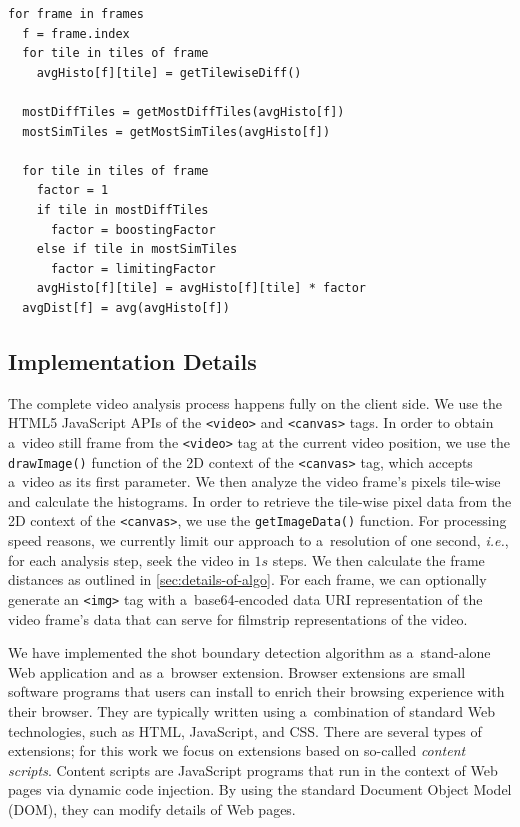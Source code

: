 \begin{lstlisting}[caption=Pseudocode of the shot boundary detection
  algorithm,
  label=code:algorithm, float]
for frame in frames
  f = frame.index  
  for tile in tiles of frame      
    avgHisto[f][tile] = getTilewiseDiff()
 
  mostDiffTiles = getMostDiffTiles(avgHisto[f])
  mostSimTiles = getMostSimTiles(avgHisto[f])
 
  for tile in tiles of frame    
    factor = 1  
    if tile in mostDiffTiles
      factor = boostingFactor
    else if tile in mostSimTiles
      factor = limitingFactor
    avgHisto[f][tile] = avgHisto[f][tile] * factor
  avgDist[f] = avg(avgHisto[f])
\end{lstlisting}

\subsection{Implementation Details}
\label{sec:implementation}

The complete video analysis process happens fully
on the client side.
We use the HTML5 JavaScript APIs of the \texttt{<video>} and
\texttt{<canvas>} tags.
In order to obtain a~video still frame
from the \texttt{<video>} tag at the current video position,
we use the \texttt{drawImage()} function of the 2D context of the
\texttt{<canvas>} tag,
which accepts a~video as its first parameter.
We then analyze the video frame's pixels tile-wise
and calculate the histograms.
In order to retrieve the tile-wise pixel data
from the 2D context of the \texttt{<canvas>},
we use the \texttt{getImageData()} function.
For processing speed reasons, we currently limit our approach to
a~resolution of one second, \emph{i.e.},
for each analysis step,
seek the video in $\mathit{1s}$ steps.
We then calculate the frame distances as outlined in
\autoref{sec:details-of-algo}.
For each frame, we can optionally generate an \texttt{<img>} tag
with a~base64-encoded data URI representation
of the video frame's data
that can serve for filmstrip representations of the video.

We have implemented the shot boundary detection algorithm
as a~stand-alone Web application and as a~browser extension.
Browser extensions are small software programs that users can install
to enrich their browsing experience with their browser.
They are typically written using a~combination of standard Web technologies,
such as HTML, JavaScript, and CSS.
There are several types of extensions; for this work
we focus on extensions based on so-called \emph{content scripts}.
Content scripts are JavaScript programs that run in the context of Web pages
via dynamic code injection.
By using the standard Document Object Model (DOM),
they can modify details of Web pages.

